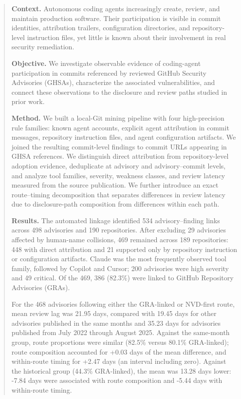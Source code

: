 \documentclass[smallextended,natbib]{svjour3}
\begin{document}
\begin{abstract}
\textbf{Context.} Autonomous coding agents increasingly create, review, and maintain production software.  Their participation is visible in commit identities, attribution trailers, configuration directories, and repository-level instruction files, yet little is known about their involvement in real security remediation.

\textbf{Objective.} We investigate observable evidence of coding-agent participation in commits referenced by reviewed GitHub Security Advisories (GHSAs), characterize the associated vulnerabilities, and connect these observations to the disclosure and review paths studied in prior work.

\textbf{Method.} We built a local-Git mining pipeline with four high-precision rule families: known agent accounts, explicit agent attribution in commit messages, repository instruction files, and agent configuration artifacts.  We joined the resulting commit-level findings to commit URLs appearing in GHSA references.  We distinguish direct attribution from repository-level adoption evidence, deduplicate at advisory and advisory--commit levels, and analyze tool families, severity, weakness classes, and review latency measured from the source publication.  We further introduce an exact route--timing decomposition that separates differences in review latency due to disclosure-path composition from differences within each path.

\textbf{Results.} The automated linkage identified 534 advisory--finding links across 498 advisories and 190 repositories. After excluding 29 advisories affected by human-name collisions, 469 remained across 189 repositories: 448 with direct attribution and 21 supported only by repository instruction or configuration artifacts. Claude was the most frequently observed tool family, followed by Copilot and Cursor; 200 advisories were high severity and 49 critical. Of the 469, 386 (82.3\%) were linked to GitHub Repository Advisories (GRAs).

For the 468 advisories following either the GRA-linked or NVD-first route, mean review lag was 21.95 days, compared with 19.45 days for other advisories published in the same months and 35.23 days for advisories published from July 2022 through August 2025. Against the same-month group, route proportions were similar (82.5\% versus 80.1\% GRA-linked); route composition accounted for +0.03 days of the mean difference, and within-route timing for +2.47 days (an interval including zero). Against the historical group (44.3\% GRA-linked), the mean was 13.28 days lower: -7.84 days were associated with route composition and -5.44 days with within-route timing.


\end{abstract}
\end{document}

